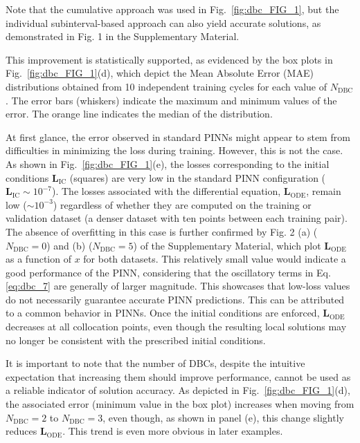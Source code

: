 Note that the cumulative approach was used in Fig.~\ref{fig:dbc_FIG_1}, but the individual subinterval-based approach can also yield accurate solutions, as demonstrated in Fig. 1 in the Supplementary Material.

This improvement is statistically supported, as evidenced by the box plots in Fig.~\ref{fig:dbc_FIG_1}(d), which depict the Mean Absolute Error (MAE) distributions obtained from 10 independent training cycles for each value of $N_{\mathrm{DBC}}$. The error bars (whiskers) indicate the maximum and minimum values of the error. The orange line indicates the median of the distribution.

At first glance, the error observed in standard PINNs might appear to stem from difficulties in minimizing the loss during training. However, this is not the case. As shown in Fig.~\ref{fig:dbc_FIG_1}(e), the losses corresponding to the initial conditions $\mathbf{L}_{\mathrm{IC}}$ (squares) are very low in the standard PINN configuration ($\mathbf{L}_{\mathrm{IC}} \sim 10^{-7}$). The losses associated with the differential equation, $\mathbf{L}_{\mathrm{ODE}}$, remain low ($\sim 10^{-3}$) regardless of whether they are computed on the training or validation dataset (a denser dataset with ten points between each training pair). The absence of overfitting in this case is further confirmed by Fig. 2 (a) ($N_{\mathrm{DBC}} = 0$) and (b) ($N_{\mathrm{DBC}} = 5$) of the Supplementary Material, which plot $\mathbf{L}_{\mathrm{ODE}}$ as a function of $x$ for both datasets. This relatively small value would indicate a good performance of the PINN, considering that the oscillatory terms in Eq. \ref{eq:dbc_7} are generally of larger magnitude. This showcases that low-loss values do not necessarily guarantee accurate PINN predictions. This can be attributed to a common behavior in PINNs. Once the initial conditions are enforced, $\mathbf{L}_{\mathrm{ODE}}$ decreases at all collocation points, even though the resulting local solutions may no longer be consistent with the prescribed initial conditions.

It is important to note that the number of DBCs, despite the intuitive expectation that increasing them should improve performance, cannot be used as a reliable indicator of solution accuracy. As depicted in Fig.~\ref{fig:dbc_FIG_1}(d), the associated error (minimum value in the box plot) increases when moving from $N_{\mathrm{DBC}} = 2$ to $N_{\mathrm{DBC}} = 3$, even though, as shown in panel (e), this change slightly reduces $\mathbf{L}_{\mathrm{ODE}}$. This trend is even more obvious in later examples.


